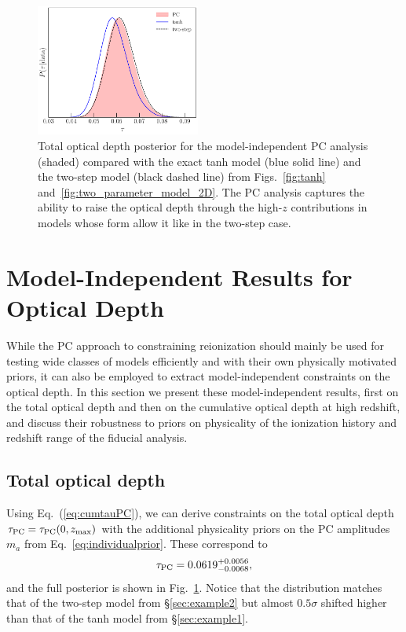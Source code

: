 \documentclass[aps,prd,twocolumn,amsmath,amssymb,showpacs,floatfix,superscriptaddress,nofootinbib]{revtex4-1}
\newcommand{\beq}{\begin{equation}}
\newcommand{\eeq}{\end{equation}}
\begin{document}
\begin{figure}[ht]
\includegraphics[width=0.48\textwidth]
{pl18_tau_posterior_tanh_vs_tanh_highz_vs_pc_dz_auto_zre_prior_6p1_normalized_by_max.pdf}
\caption{Total optical depth posterior for the model-independent PC analysis (shaded) compared with the exact tanh model (blue solid line) and the two-step model (black dashed line) from Figs.~\ref{fig:tanh} and~\ref{fig:two_parameter_model_2D}. The PC analysis captures the ability to raise the optical depth through the high-$z$ contributions in models whose form allow it like in the two-step case.
}
\label{fig:tauPC}
\end{figure}


\section{Model-Independent Results for Optical Depth}
\label{sec:modelindependent}

While the PC approach to constraining reionization should mainly be used for 
testing wide classes of models efficiently and with their own physically motivated priors, it can also be employed to extract model-independent constraints on the optical depth. 
In this section we present these model-independent results, 
first on the total optical depth and then on the cumulative optical depth at high redshift, and discuss their robustness to priors  on physicality of the ionization history and redshift range of the fiducial analysis.



\subsection{Total optical depth}

\label{sec:note_on_priors}


Using Eq.~(\ref{eq:cumtauPC}), we can derive constraints on the total optical
depth $\tau_{\rm PC}=\tau_{\rm PC}(0,z_{\rm max})$ with the additional physicality priors on the PC amplitudes $m_a$ from
Eq.~\ref{eq:individualprior}.  These 
correspond to 
%
\beq
\tau_{\rm PC} = 0.0619^{+0.0056}_{-0.0068},
\label{eq:tau_pc_zmax30}
\eeq  
%
and the full posterior is shown in Fig.~\ref{fig:tauPC}. 
Notice that the distribution matches that of the two-step model from \S \ref{sec:example2} but almost $0.5\sigma$ shifted higher than that of the tanh model from \S \ref{sec:example1}.  
\end{document}
